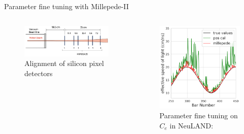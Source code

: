 \documentclass{ikpKoeln}
\begin{document}
\begin{frame}[t]{Parameter fine tuning with Millepede-II}
\begin{columns}[t]
\begin{column}{0.45 \textwidth}
			\begin{figure}
				\vspace{-0.5em}
				\includegraphics[width =\textwidth]{DPG2025/SilliconPixel.png}
				\caption*{Alignment of silicon pixel detectors }
			\end{figure}
			\vspace{-2.2em}
		\end{column}
		\begin{column}{0.45 \textwidth}
			\pause
			\begin{figure}
				\captionsetup{singlelinecheck=off}
				\caption*{Parameter fine tuning on $C_e$ in NeuLAND:}
				\vspace{-0.5em}
				\includegraphics[width = \textwidth]{DPG2025/sim_comp_c.png}
			\end{figure}
		\end{column}
	\end{columns}
\end{frame}
\end{document}
